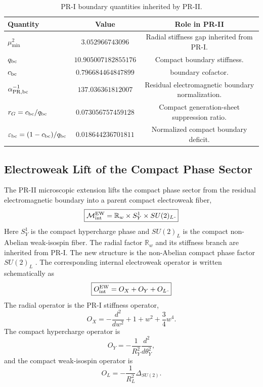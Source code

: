 \documentclass[11pt]{article}
\renewcommand{\arraystretch}{1.22}
\renewcommand{\arraystretch}{1.4}
\begin{document}
\begin{table}[ht!]
\centering
\caption{PR-I boundary quantities inherited by PR-II.}
\label{tab:pr2_inherited_boundary_ledger}
\small
\renewcommand{\arraystretch}{1.25}
\begin{tabular}{lcc}
\hline
\textbf{Quantity} & \textbf{Value} & \textbf{Role in PR-II} \\ \hline
\(\mu_{\min}^2\) 
& \(3.052966743096\) 
& Radial stiffness gap inherited from PR-I. \\

\(q_{\rm bc}\) 
& \(10.905007182855176\) 
& Compact boundary stiffness. \\

\(c_{\rm bc}\) 
& \(0.796684464847899\) 
& boundary cofactor. \\

\(\alpha_{\rm PR,bc}^{-1}\) 
& \(137.036361812007\) 
& Residual electromagnetic boundary normalization. \\

\(r_G=c_{\rm bc}/q_{\rm bc}\) 
& \(0.073056757459128\) 
& Compact generation-sheet suppression ratio. \\

\(\varepsilon_{\rm bc}=(1-c_{\rm bc})/q_{\rm bc}\) 
& \(0.018644236701811\) 
& Normalized compact boundary deficit. \\ \hline
\end{tabular}
\end{table}

\subsection{Electroweak Lift of the Compact Phase Sector}
\label{sec:pr2_electroweak_lift_from_pr1}

The PR-II microscopic extension lifts the compact phase sector from the residual electromagnetic boundary into a parent compact electroweak fiber,
\begin{equation}
\boxed{
\mathcal M_{\rm int}^{\rm EW}
=
\mathbb R_w
\times
S_Y^1
\times
SU(2)_L.
}
\end{equation}
Here \(S_Y^1\) is the compact hypercharge phase and \(SU(2)_L\) is the compact non-Abelian weak-isospin fiber. 
The radial factor \(\mathbb R_w\) and its stiffness branch are inherited from PR-I. 
The new structure is the non-Abelian compact phase factor \(SU(2)_L\) \cite{GuralnikHagenKibble1964, Salam1968}. The corresponding internal electroweak operator is written schematically as
\begin{equation}
\boxed{
O_{\rm int}^{\rm EW}
=
O_X
+
O_Y
+
O_L.
}
\end{equation}
The radial operator is the PR-I stiffness operator,
\begin{equation}
O_X = -\frac{d^2}{dw^2} + 1+w^2+\frac34w^4.
\end{equation}
The compact hypercharge operator is
\begin{equation}
\boxed{
O_Y
=
-\frac{1}{R_Y^2}
\frac{d^2}{d\theta_Y^2},
}
\end{equation}
and the compact weak-isospin operator is
\begin{equation}
\boxed{
O_L
=
-\frac{1}{R_L^2}
\Delta_{SU(2)}.
}
\end{equation}
\end{document}
